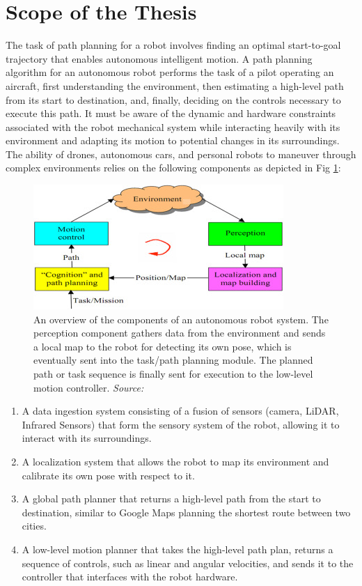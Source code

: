\section{Scope of the Thesis}

The task of path planning for a robot involves finding an optimal start-to-goal trajectory that enables autonomous intelligent motion. A path planning algorithm for an autonomous robot performs the task of a pilot operating an aircraft, first understanding the environment, then estimating a high-level path from its start to destination, and, finally, deciding on the controls necessary to execute this path. It must be aware of the dynamic and hardware constraints associated with the robot mechanical system while interacting heavily with its environment and adapting its motion to potential changes in its surroundings. The ability of drones, autonomous cars, and personal robots to maneuver through complex environments relies on the following components as depicted in Fig \ref{fig:intro_overview_robot}:

\begin{figure}[ht]
    \centering
    \includegraphics{figures/intro/overview_robot.jpg}
    \caption[Overview of Autonomous Robot Systems]{An overview of the components of an autonomous robot system. The perception component gathers data from the environment and sends a local map to the robot for detecting its own pose, which is eventually sent into the task/path planning module. The planned path or task sequence is finally sent for execution to the low-level motion controller. \textit{Source: \cite{overview_robot}}}
    \label{fig:intro_overview_robot}
\end{figure}

\begin{enumerate}
    \item A data ingestion system consisting of a fusion of sensors (camera, LiDAR, Infrared Sensors) that form the sensory system of the robot, allowing it to interact with its surroundings. 
    \item A localization system that allows the robot to map its environment and calibrate its own pose with respect to it.
    \item\label{item:global-planning} A global path planner that returns a high-level path from the start to destination, similar to Google Maps planning the shortest route between two cities.
    \item\label{item:local-planning} A low-level motion planner that takes the high-level path plan, returns a sequence of controls, such as linear and angular velocities, and sends it to the controller that interfaces with the robot hardware.
\end{enumerate}

